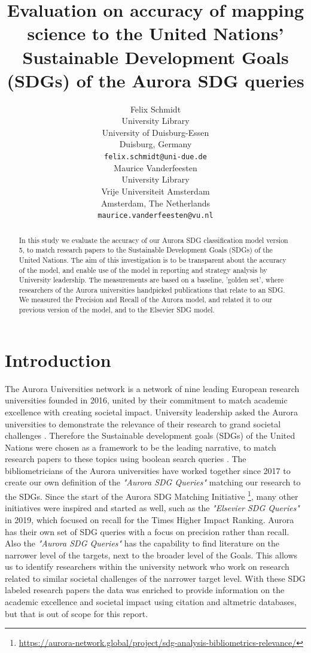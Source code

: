 \documentclass{article}
\title{Evaluation on accuracy of mapping science to the United Nations' Sustainable Development Goals (SDGs) of the Aurora SDG queries}
\author{
  Felix Schmidt \\
  University Library\\
  University of Duisburg-Essen\\
  Duisburg, Germany\\
  \texttt{felix.schmidt@uni-due.de} \\
   \And
Maurice Vanderfeesten \\
  University Library\\
  Vrije Universiteit Amsterdam\\
  Amsterdam, The Netherlands \\
  \texttt{maurice.vanderfeesten@vu.nl} \\
}
\begin{document}
\maketitle

\begin{abstract}
In this study we evaluate the accuracy of our Aurora SDG classification model version 5, to match research papers to the Sustainable Development Goals (SDGs) of the United Nations. The aim of this investigation is to be transparent about the accuracy of the model, and enable use of the model in reporting and strategy analysis by University leadership. The measurements are based on a baseline, 'golden set', where researchers of the Aurora universities handpicked publications that relate to an SDG. We measured the Precision and Recall of the Aurora model, and related it to our previous version of the model, and to the Elsevier SDG model. 
\end{abstract}




\section{Introduction}
The Aurora Universities network is a network of nine leading European research universities founded in 2016, united by their commitment to match academic excellence with creating societal impact. University leadership asked the Aurora universities to demonstrate the relevance of their research to grand societal challenges \cite{vanderfeesten_societal_2017} \cite{drooge_evaluating_2010} \cite{carley_social_2019}. Therefore the Sustainable development goals (SDGs) of the United Nations were chosen as a framework to be the leading narrative, to match research papers to these topics using boolean search queries \cite{armitage_mapping_2020}. The bibliometricians of the Aurora universities have worked together since 2017 to create our own definition of the \emph{"Aurora SDG Queries"} matching our research to the SDGs. Since the start of the Aurora SDG Matching Initiative \footnote{\url{https://aurora-network.global/project/sdg-analysis-bibliometrics-relevance/}}, many other initiatives were inspired and started as well, such as the \emph{"Elsevier SDG Queries"} \cite{jayabalasingham_identifying_2019}  in 2019, which focused on recall for the Times Higher Impact Ranking. Aurora has their own set of SDG queries with a focus on precision rather than recall. Also the \emph{"Aurora SDG Queries"} has the capability to find literature on the narrower level of the targets, next to the broader level of the Goals. This allows us to identify researchers within the university network who work on research related to similar societal challenges of the narrower target level.  With these SDG labeled research papers the data was enriched to provide information on the academic excellence and societal impact \cite{bornmann_what_2013} using citation and altmetric databases, but that is out of scope for this report. 
\end{document}
